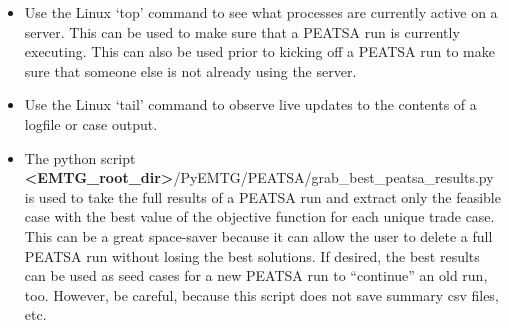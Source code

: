 
\begin{itemize}
	\item Use the Linux `top' command to see what processes are currently active on a server. This can be used to make sure that a \ac{PEATSA} run is currently executing. This can also be used prior to kicking off a \ac{PEATSA} run to make sure that someone else is not already using the server.
	\item Use the Linux `tail' command to observe live updates to the contents of a logfile or case output.
	\item The python script \textbf{\textless EMTG\_root\_dir\textgreater}/PyEMTG/PEATSA/grab\_best\_peatsa\_results.py is used to take the full	results of a \ac{PEATSA} run and extract only the feasible case with the best value of the objective function for each unique trade case. This can be a great space-saver because it can allow the user to delete a full \ac{PEATSA} run without losing the best solutions. If desired, the best results can be used as seed cases for a new \ac{PEATSA} run to ``continue'' an old run, too. However, be careful, because this script does not save summary csv files, etc.
\end{itemize}